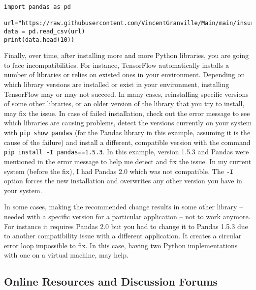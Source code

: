 \documentclass[oneside,10pt]{book}
\begin{document}
\begin{lstlisting}
import pandas as pd

url="https://raw.githubusercontent.com/VincentGranville/Main/main/insurance.csv"
data = pd.read_csv(url)
print(data.head(10))
\end{lstlisting}\vspace{1ex}

Finally, over time, after installing more and more Python libraries, you are going to face incompatibilities. For instance,
 \textcolor{index}{TensorFlow} automatically installs a number of libraries or relies on existed ones  in your environment. Depending on which library versions are installed or exist in your environment, installing
 TensorFlow may or may not succeed. 
In many cases, reinstalling specific versions of some other libraries, or an older version of the library that you try to install, may fix the issue. In case of failed installation, check out the error message to see which libraries are causing problems, detect
 the versions currently on your system with \texttt{pip show pandas} (for the Pandas library in this example, assuming it is the cause of the failure) and install a different, compatible version  with the command \texttt{pip install -I pandas==1.5.3}. In this example,
version 1.5.3 and Pandas were mentioned in the error message to help me detect and fix the issue. In my current system (before the fix),
 I had Pandas 2.0 which was not compatible. 
The \texttt{-I} option forces the new installation and overwrites any other version you have in your system. 

In some cases, making the recommended change results in some other library -- needed with a specific version for a particular application -- 
 not to work anymore. For instance it requires Pandas 2.0 but you had to change it to Pandas 1.5.3 due to another compatibility issue with a different application. It creates a circular error loop impossible to fix. In this case, having two Python implementations with one on a virtual machine, may help.



\subsection{Online Resources and Discussion Forums} 
\end{document}
